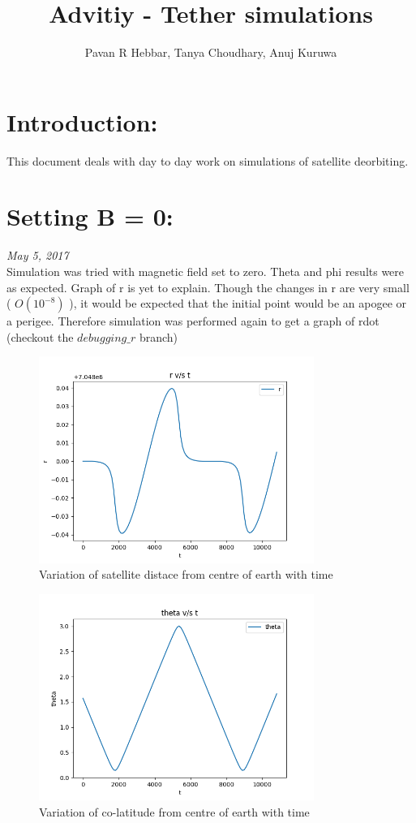 \documentclass[11pt, a4paper]{article}
\title{\textbf{Advitiy - Tether simulations}}
\author{Pavan R Hebbar, Tanya Choudhary, Anuj Kuruwa}
\begin{document}
\maketitle
\newpage
\tableofcontents
\newpage
\section{Introduction:}
This document deals with day to day work on simulations of satellite deorbiting.

\section{Setting B = 0:}
\emph{May 5, 2017} \\

Simulation was tried with magnetic field set to zero. Theta and phi results were as expected. Graph of r is yet to explain. 
Though the changes in r are very small ( $O(10^{-8})$ ), it would be expected that the initial point would be an apogee or a 
perigee. Therefore simulation was performed again to get a graph of rdot (checkout the $debugging\_r$ branch)

\begin{figure}[H]
 \centering
 \includegraphics[width = 0.8\textwidth]{r_arr0.png}
 \caption{Variation of satellite distace from centre of earth with time}
\end{figure}

\begin{figure}[H]
 \centering
 \includegraphics[width = 0.8\textwidth]{t_arr0.png}
 \caption{Variation of co-latitude from centre of earth with time}
\end{figure}
\end{document}
